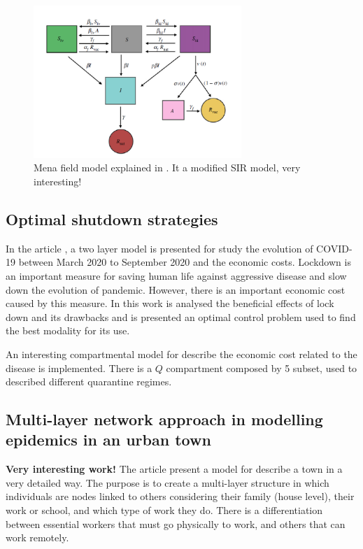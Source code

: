 \documentclass[a4paper,11pt]{scrartcl}
\begin{document}
	\begin{figure}[H]
		\centering
		\includegraphics[width=0.7\textwidth]{images_note/three_fears.png}
		\caption{Mena field model explained in \cite{Epstein2021}. It a modified SIR model, very interesting! } 
		\label{fig:three_fear}
	\end{figure}
	
	
		\subsection{Optimal shutdown strategies}
		In the article \cite{Barlow2021}, a two layer model is presented for study the evolution of COVID-19 between March 2020 to September 2020 and the economic costs. 
		Lockdown is an important measure for saving human life against aggressive disease and slow down the evolution of pandemic. However, there is an important economic cost caused by this measure. 
		In this work is analysed the beneficial effects of lock down and its drawbacks and is presented an optimal control problem used to find the best modality for its use. 
		
		
		
		An interesting compartmental model for  describe the economic cost related to the disease is implemented. There is a $Q$ compartment composed by 5 subset, used to described different quarantine regimes. 
		

	
	\subsection{Multi-layer network approach in modelling epidemics in an urban town}
	\textbf{Very interesting work!} The article \cite{Turker2021}  present a  model for describe a town in a very detailed way. The purpose is to create a multi-layer structure in which individuals are nodes linked to others considering their family (house level), their work or school, and which type of work they do. There is a differentiation between essential workers that must go physically to work, and others that can work remotely. 
	
\end{document}
